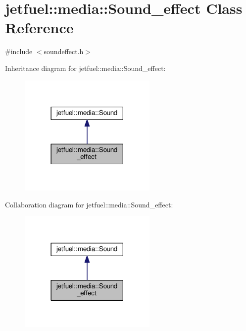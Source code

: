 \hypertarget{classjetfuel_1_1media_1_1Sound__effect}{}\section{jetfuel\+:\+:media\+:\+:Sound\+\_\+effect Class Reference}
\label{classjetfuel_1_1media_1_1Sound__effect}


{\ttfamily \#include $<$soundeffect.\+h$>$}



Inheritance diagram for jetfuel\+:\+:media\+:\+:Sound\+\_\+effect\+:
\nopagebreak
\begin{figure}[H]
\begin{center}
\leavevmode
\includegraphics[width=189pt]{classjetfuel_1_1media_1_1Sound__effect__inherit__graph}
\end{center}
\end{figure}


Collaboration diagram for jetfuel\+:\+:media\+:\+:Sound\+\_\+effect\+:
\nopagebreak
\begin{figure}[H]
\begin{center}
\leavevmode
\includegraphics[width=189pt]{classjetfuel_1_1media_1_1Sound__effect__coll__graph}
\end{center}
\end{figure}
